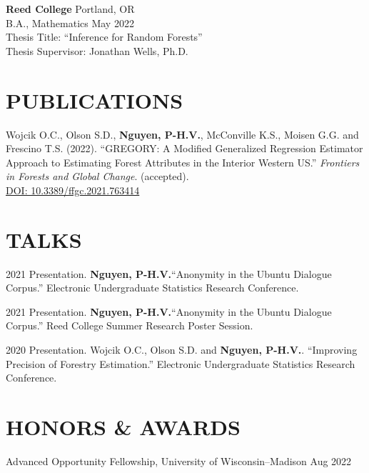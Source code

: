 \documentclass[margin]{res}
\def\pvn{\textbf{Nguyen, P-H.V.}}
\begin{document}
\begin{resume}
                {\bf Reed College} \hfill Portland, OR \\
                B.A., Mathematics \hfill May 2022 \\
                Thesis Title: ``Inference for Random Forests'' \\
                Thesis Supervisor: Jonathan Wells, Ph.D.
  
  


\section{PUBLICATIONS}

Wojcik O.C., Olson S.D., \pvn, McConville K.S., Moisen G.G. and Frescino T.S. (2022). ``GREGORY: A Modified Generalized Regression Estimator Approach to Estimating Forest Attributes in the Interior Western US.'' \textit{Frontiers in Forests and Global Change}. (accepted). \\ \href{https://doi.org/10.3389/ffgc.2021.763414}{DOI: 10.3389/ffgc.2021.763414}



\section{TALKS}

2021 Presentation. \pvn “Anonymity in the Ubuntu Dialogue Corpus.” Electronic Undergraduate Statistics Research Conference.

2021 Presentation. \pvn “Anonymity in the Ubuntu Dialogue Corpus.” Reed College Summer Research Poster Session.

2020 Presentation. Wojcik O.C., Olson S.D. and \pvn. “Improving Precision of Forestry Estimation.” Electronic Undergraduate Statistics Research Conference.


\section{HONORS \& AWARDS} 

Advanced Opportunity Fellowship, University of Wisconsin--Madison \hfill Aug 2022


\end{resume}
\end{document}
